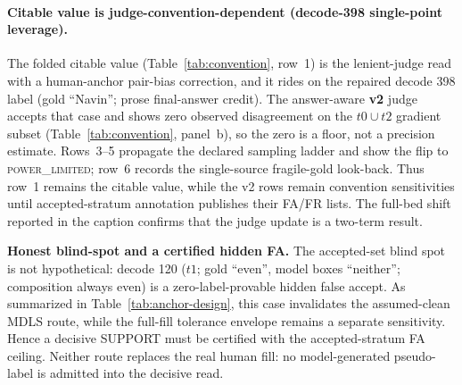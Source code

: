 \documentclass{article}
\begin{document}
\paragraph{Citable value is judge-convention-dependent (decode-398 single-point leverage).}
The folded citable value (Table~\ref{tab:convention}, row~1) is the lenient-judge
read with a human-anchor pair-bias correction, and it rides on the repaired decode 398
label (gold ``Navin''; prose final-answer credit).  The answer-aware \textbf{v2} judge
accepts that case and shows zero observed disagreement on the $t0\cup t2$ gradient
subset (Table~\ref{tab:convention}, panel~b), so the zero is a floor, not a precision
estimate.  Rows~3--5 propagate the declared sampling
ladder and show the flip to \textsc{power\_limited}; row~6 records the single-source
fragile-gold look-back.  Thus row~1 remains the citable value, while the v2 rows remain
convention sensitivities until accepted-stratum annotation publishes their FA/FR
lists.  The full-bed shift reported in the caption confirms that the judge update is a
two-term result.

\textbf{Honest blind-spot and a certified hidden FA.}  The accepted-set blind spot
is not hypothetical: decode 120 ($t1$; gold ``even'', model boxes ``neither'';
composition always even) is a zero-label-provable hidden false accept.  As summarized
in Table~\ref{tab:anchor-design}, this case invalidates the assumed-clean MDLS route,
while the full-fill tolerance envelope remains a separate sensitivity.  Hence a
decisive SUPPORT must be certified with the accepted-stratum FA ceiling.  Neither
route replaces the real human fill: no model-generated pseudo-label is admitted into
the decisive read.
\end{document}
